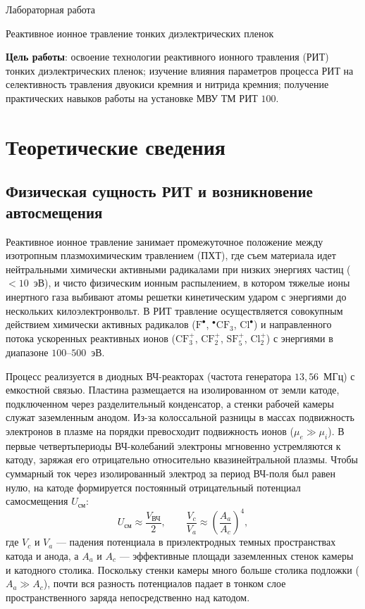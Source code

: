 \documentclass[12pt,a4paper]{article}
\theoremstyle{plain}
\theoremstyle{definition}
\theoremstyle{remark}
\numberwithin{equation}{section}
\begin{document}
\begin{center}
    \Large Лабораторная работа 
\end{center}

\begin{center}
    \large Реактивное ионное травление тонких диэлектрических пленок
\end{center}

\textbf{Цель работы}: освоение технологии реактивного ионного травления (РИТ) тонких диэлектрических пленок; изучение влияния параметров процесса РИТ на селективность травления двуокиси кремния и нитрида кремния; получение практических навыков работы на установке МВУ ТМ РИТ $100$.

\section{Теоретические сведения}

\subsection{Физическая сущность РИТ и возникновение автосмещения}

Реактивное ионное травление занимает промежуточное положение между изотропным плазмохимическим травлением (ПХТ), где съем материала идет нейтральными химически активными радикалами при низких энергиях частиц ($< 10$~эВ), и чисто физическим ионным распылением, в котором тяжелые ионы инертного газа выбивают атомы решетки кинетическим ударом с энергиями до нескольких килоэлектронвольт. В РИТ травление осуществляется совокупным действием химически активных радикалов ($\mathrm{F}^\bullet$, $^\bullet\mathrm{CF}_3$, $\mathrm{Cl}^\bullet$) и направленного потока ускоренных реактивных ионов ($\mathrm{CF}_3^+$, $\mathrm{CF}_2^+$, $\mathrm{SF}_5^+$, $\mathrm{Cl}_2^+$) с энергиями в диапазоне $100\text{--}500$~эВ.

Процесс реализуется в диодных ВЧ-реакторах (частота генератора $13{,}56$~МГц) с емкостной связью. Пластина размещается на изолированном от земли катоде, подключенном через разделительный конденсатор, а стенки рабочей камеры служат заземленным анодом. Из-за колоссальной разницы в массах подвижность электронов в плазме на порядки превосходит подвижность ионов ($\mu_e \gg \mu_i$). В первые четвертьпериоды ВЧ-колебаний электроны мгновенно устремляются к катоду, заряжая его отрицательно относительно квазинейтральной плазмы. Чтобы суммарный ток через изолированный электрод за период ВЧ-поля был равен нулю, на катоде формируется постоянный отрицательный потенциал самосмещения $U_\text{см}$:
\begin{equation*}
  U_\text{см} \approx \frac{V_\text{ВЧ}}{2}, \qquad \frac{V_c}{V_a} \approx \left(\frac{A_a}{A_c}\right)^4,
\end{equation*}
где $V_c$ и $V_a$ — падения потенциала в приэлектродных темных пространствах катода и анода, а $A_a$ и $A_c$ — эффективные площади заземленных стенок камеры и катодного столика. Поскольку стенки камеры много больше столика подложки ($A_a \gg A_c$), почти вся разность потенциалов падает в тонком слое пространственного заряда непосредственно над катодом.
\end{document}
